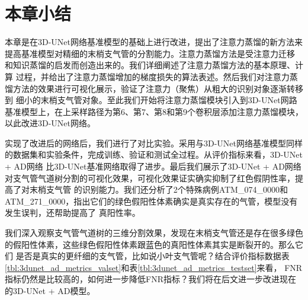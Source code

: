 \section{本章小结}

本章是在3D-UNet网络基准模型的基础上进行改进，提出了注意力蒸馏的新方法来提高基准模型对精细的末梢支气管的分割能力。注意力蒸馏方法是受注意力迁移
\cite{Zagoruyko2016PayingMA}和知识蒸馏\cite{Hinton2015DistillingTK}的启发而创造出来的。我们详细阐述了注意力蒸馏方法的基本原理、计算
过程，并给出了注意力蒸馏增加的梯度损失的算法表述。然后我们对注意力蒸馏方法的效果进行可视化展示，验证了注意力（聚焦）从粗大的识别对象逐渐转移到
细小的末梢支气管对象。至此我们开始将注意力蒸馏模块引入到3D-UNet网路基准模型上，在上采样路径为第6、第7、第8和第9个卷积层添加注意力蒸馏模块，
以此改进3D-UNet网络。

实现了改进后的网络后，我们进行了对比实验。采用与3D-UNet网络基准模型同样的数据集和实验条件，完成训练、验证和测试全过程。从评价指标来看，3D-UNet + AD网络
比3D-UNet基准网络取得了进步。最后我们展示了3D-UNet + AD网络对支气管气道树分割的可视化效果，可视化效果证实确实抑制了红色假阴性率，提高了对末梢支气管
的识别能力。我们还分析了2个特殊病例ATM\_074\_0000和ATM\_271\_0000，指出它们的绿色假阳性体素确实是真实存在的气管，模型没有发生误判，还帮助提高了
真阳性率。

我们深入观察支气管气道树的三维分割效果，发现在末梢支气管还是存在很多绿色的假阳性体素，这些绿色假阳性体素跟蓝色的真阳性体素其实是断裂开的。那么它们
是否是真实的更纤细的支气管，比如说小叶支气管呢？结合评价指标数据表\ref{tbl:3dunet_ad_metrics_valset}和表\ref{tbl:3dunet_ad_metrics_testset}来看，
FNR指标仍然是比较高的，如何进一步降低FNR指标？我们将在后文进一步改进现在的3D-UNet + AD模型。